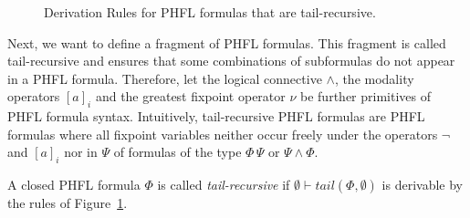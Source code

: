 \begin{figure}
    \caption{Derivation Rules for PHFL formulas that are tail-recursive.}
    \label{figure:phfl-tail-recursive}
\end{figure}

Next, we want to define a fragment of PHFL formulas. This fragment is called tail-recursive and ensures that
some combinations of subformulas do not appear in a PHFL formula. Therefore, let the logical connective
$\wedge$, the modality operators $[a]_i$ and the greatest fixpoint operator $\nu$ be further primitives of PHFL formula
syntax. Intuitively, tail-recursive PHFL formulas are PHFL formulas where all fixpoint variables neither occur freely
under the operators $\neg$ and $[a]_i$ nor in $\Psi$ of formulas of the type $\Phi\,\Psi$ or $\Psi \wedge \Phi$.

\begin{definition}
    A closed PHFL formula $\Phi$ is called \emph{tail-recursive} if $\emptyset \vdash tail(\Phi, \emptyset)$ is
    derivable by the rules of Figure~\ref{figure:phfl-tail-recursive}.
\end{definition}

